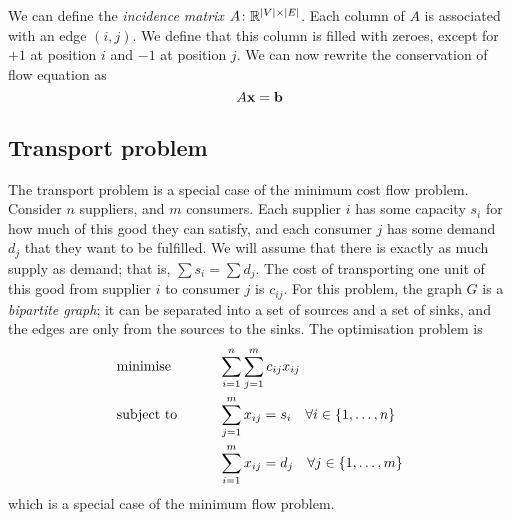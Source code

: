 \begin{definition}
	We can define the \textit{incidence matrix} \( A \colon \mathbb R^{\abs{V} \times \abs{E}} \).
	Each column of \( A \) is associated with an edge \( (i,j) \).
	We define that this column is filled with zeroes, except for \( +1 \) at position \( i \) and \( -1 \) at position \( j \).
	We can now rewrite the conservation of flow equation as
	\[
		A\vb x = \vb b
	\]
\end{definition}

\subsection{Transport problem}
The transport problem is a special case of the minimum cost flow problem.
Consider \( n \) suppliers, and \( m \) consumers.
Each supplier \( i \) has some capacity \( s_i \) for how much of this good they can satisfy,
and each consumer \( j \) has some demand \( d_j \) that they want to be fulfilled.
We will assume that there is exactly as much supply as demand; that is, \( \sum s_i = \sum d_j \).
The cost of transporting one unit of this good from supplier \( i \) to consumer \( j \) is \( c_{ij} \).
For this problem, the graph \( G \) is a \textit{bipartite graph}; it can be separated into a set of sources and a set of sinks, and the edges are only from the sources to the sinks.
The optimisation problem is
\begin{alignat*}{2}
	 & \text{minimise}   & \qquad & \sum_{i = 1}^n \sum_{j = 1}^m c_{ij}x_{ij}                      \\
	 & \text{subject to} &        & \sum_{j = 1}^m x_{ij} = s_i \quad \forall i \in \qty{1,\dots,n} \\
	 &                   &        & \sum_{i = 1}^m x_{ij} = d_j \quad \forall j \in \qty{1,\dots,m} \\
\end{alignat*}
which is a special case of the minimum flow problem.

